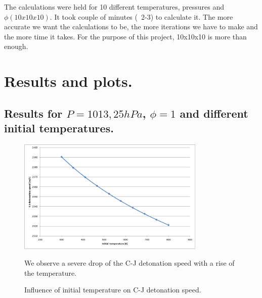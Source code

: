 \documentclass[11pt]{article}
\begin{document}
The calculations were held for 10 different temperatures, pressures and $\phi (10x10x10)$. It took couple of minutes (~2-3) to calculate it. The more accurate we want the calculations to be, the more iterations we have to make and the more time it takes. For the purpose of this project, 10x10x10 is more than enough.

\section{Results and plots.}









\subsection{Results for $P=1013,25hPa$,  $\phi =1$ and different initial temperatures.}
 
 \begin{figure} [H]
	\begin{center}
    	\includegraphics[width=0.8\textwidth]{ftemp_speed}
        \caption{Influence of initial temperature on  C-J detonation speed.}
    \end{center}
\normalsize
{We observe a severe drop of the C-J detonation speed with a rise of the temperature.}
\end{figure}
\end{document}

